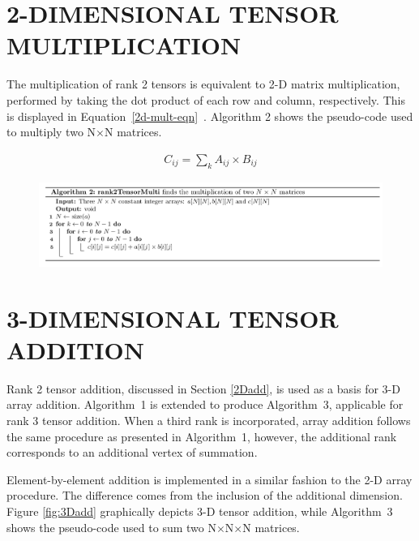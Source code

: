 \section{2-DIMENSIONAL TENSOR MULTIPLICATION} \label{2Dmult}

The multiplication of rank 2 tensors is equivalent to 2-D matrix multiplication, performed by taking the dot product of each row and column, respectively. This is displayed in Equation~\ref{2d-mult-eqn}~\cite{matrix_Multi}. Algorithm 2 shows the pseudo-code used to multiply two N$\times$N matrices. \vspace{-5mm}

\begin{align}
C_{ij} = \sum_{k} A_{ij} \times B_{ij} \label{2d-mult-eqn}
\end{align}

\vspace{-1.5mm}
\begin{figure}[H]
\includegraphics[width=\textwidth]{build/Algo2.png}
\end{figure}

\section{3-DIMENSIONAL TENSOR ADDITION} \label{3Dadd}

Rank 2 tensor addition, discussed in Section \ref{2Dadd}, is used as a basis for 3-D array addition. Algorithm~1 is extended to produce Algorithm~3, applicable for rank 3 tensor addition. When a third rank is incorporated, array addition follows the same procedure as presented in Algorithm~1, however, the additional rank corresponds to an additional vertex of summation.

Element-by-element addition is implemented in a similar fashion to the 2-D array procedure. The difference comes from the inclusion of the additional dimension. Figure \ref{fig:3Dadd} graphically depicts 3-D tensor addition, while Algorithm~3 shows the pseudo-code used to sum two N$\times$N$\times$N matrices. \vspace{3mm}

